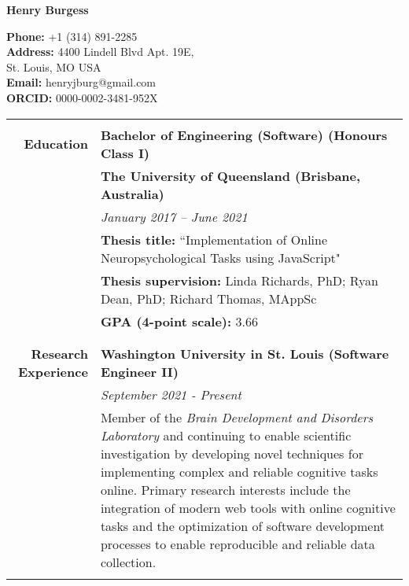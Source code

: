 \documentclass{article}
\begin{document}
	\begin{minipage}{2.5in}
		\huge\textbf{Henry Burgess} 
	\end{minipage}
	\hfill
	\begin{minipage}{3in}
		\textbf{Phone:}  +1 (314) 891-2285 \\
		\hfill \textbf{Address:} 4400 Lindell Blvd Apt. 19E, \\
		St. Louis, MO USA \\
		\textbf{Email:} henryjburg@gmail.com \\
		\textbf{ORCID:} 0000-0002-3481-952X
	\end{minipage}

	\begin{longtable}{r | p{13cm}}
											\hline \\
		\large\textbf{Education} 		  	& \large\textbf{Bachelor of Engineering (Software) (Honours Class I)} \\
											& \textbf{The University of Queensland (Brisbane, Australia)} \\
											& \textit{January 2017 – June 2021} \\
											& \textbf{Thesis title:} ``Implementation of Online Neuropsychological Tasks using JavaScript" \\
											& \textbf{Thesis supervision:} Linda Richards, PhD; Ryan Dean, PhD; Richard Thomas, MAppSc \\
											& \textbf{GPA (4-point scale):} 3.66 \\
											& \\
											\hline \\

		\large\textbf{Research Experience}  & \large\textbf{Washington University in St. Louis (Software Engineer II)} \\
											& \textit{September 2021 - Present} \\
											& Member of the \textit{Brain Development and Disorders Laboratory} and continuing to enable scientific investigation by developing novel techniques for implementing complex and reliable cognitive tasks online. Primary research interests include the integration of modern web tools with online cognitive tasks and the optimization of software development processes to enable reproducible and reliable data collection. \\ 
											& \\


\end{longtable}
\end{document}
